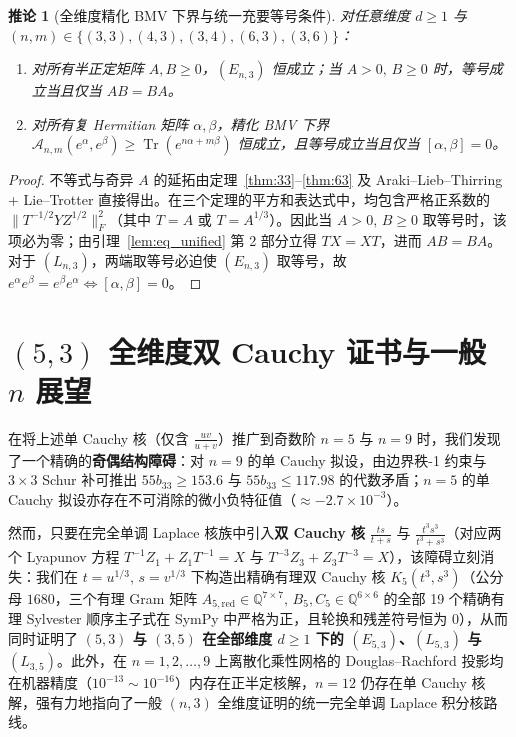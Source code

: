 \documentclass[11pt,a4paper]{article}
\newtheorem{corollary}[theorem]{推论}
\theoremstyle{remark}
\newcommand{\Tr}{\operatorname{Tr}}
\begin{document}
\begin{corollary}[全维度精化 BMV 下界与统一充要等号条件]\label{cor:all}
对任意维度 $d\ge 1$ 与 $(n,m) \in \{(3,3), (4,3), (3,4), (6,3), (3,6)\}$：
\begin{enumerate}
  \item 对所有半正定矩阵 $A,B\ge 0$，$(E_{n,3})$ 恒成立；当 $A > 0,\, B \ge 0$ 时，等号成立当且仅当 $AB = BA$。
  \item 对所有复 Hermitian 矩阵 $\alpha, \beta$，精化 BMV 下界 $\mathcal{A}_{n,m}(e^\alpha, e^\beta) \ge \Tr(e^{n\alpha+m\beta})$ 恒成立，且等号成立当且仅当 $[\alpha, \beta] = 0$。
\end{enumerate}
\end{corollary}

\begin{proof}
不等式与奇异 $A$ 的延拓由定理~\ref{thm:33}--\ref{thm:63} 及 Araki--Lieb--Thirring + Lie--Trotter 直接得出。在三个定理的平方和表达式中，均包含严格正系数的 $\|T^{-1/2} Y Z^{1/2}\|_F^2$（其中 $T = A$ 或 $T = A^{1/3}$）。因此当 $A > 0,\, B \ge 0$ 取等号时，该项必为零；由引理~\ref{lem:eq_unified} 第 2 部分立得 $T X = X T$，进而 $A B = B A$。对于 $(L_{n,3})$，两端取等号必迫使 $(E_{n,3})$ 取等号，故 $e^\alpha e^\beta = e^\beta e^\alpha \iff [\alpha,\beta] = 0$。
\end{proof}

\section{$(5,3)$ 全维度双 Cauchy 证书与一般 $n$ 展望}

在将上述单 Cauchy 核（仅含 $\frac{uv}{u+v}$）推广到奇数阶 $n=5$ 与 $n=9$ 时，我们发现了一个精确的\textbf{奇偶结构障碍}：对 $n=9$ 的单 Cauchy 拟设，由边界秩-1 约束与 $3\times 3$ Schur 补可推出 $55 b_{33} \ge 153.6$ 与 $55 b_{33} \le 117.98$ 的代数矛盾；$n=5$ 的单 Cauchy 拟设亦存在不可消除的微小负特征值（$\approx -2.7\times 10^{-3}$）。

然而，只要在完全单调 Laplace 核族中引入\textbf{双 Cauchy 核} $\frac{ts}{t+s}$ 与 $\frac{t^3 s^3}{t^3+s^3}$（对应两个 Lyapunov 方程 $T^{-1}Z_1 + Z_1 T^{-1} = X$ 与 $T^{-3}Z_3 + Z_3 T^{-3} = X$），该障碍立刻消失：我们在 $t = u^{1/3},\, s = v^{1/3}$ 下构造出精确有理双 Cauchy 核 $K_5(t^3, s^3)$（公分母 $1680$，三个有理 Gram 矩阵 $A_{5,\mathrm{red}}\in\mathbb{Q}^{7\times 7},\, B_5,C_5\in\mathbb{Q}^{6\times 6}$ 的全部 19 个精确有理 Sylvester 顺序主子式在 SymPy 中严格为正，且轮换和残差符号恒为 $0$），从而同时证明了 \textbf{$(5,3)$ 与 $(3,5)$ 在全部维度 $d\ge 1$ 下的 $(E_{5,3})$、$(L_{5,3})$ 与 $(L_{3,5})$}。此外，在 $n = 1, 2, \dots, 9$ 上离散化乘性网格的 Douglas--Rachford 投影均在机器精度（$10^{-13}\sim 10^{-16}$）内存在正半定核解，$n=12$ 仍存在单 Cauchy 核解，强有力地指向了一般 $(n,3)$ 全维度证明的统一完全单调 Laplace 积分核路线。
\end{document}
